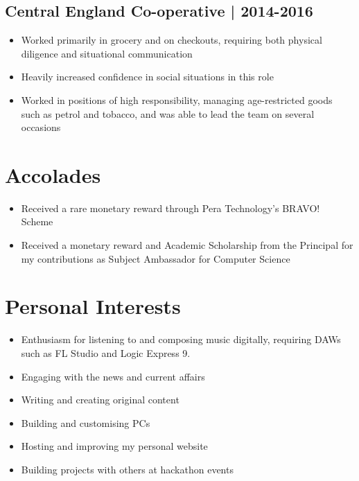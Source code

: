 \documentclass{article}
\begin{document}
\subsection*{Central England Co-operative | 2014-2016}
\begin{itemize}
	\item Worked primarily in grocery and on checkouts, requiring both physical diligence and situational communication
	\item Heavily increased confidence in social situations in this role
	\item Worked in positions of high responsibility, managing age-restricted goods such as petrol and tobacco, and was able to lead the team on several occasions
\end{itemize}
\section*{Accolades}
\begin{itemize}
	\item Received a rare monetary reward through Pera Technology's BRAVO! Scheme
	\item Received a monetary reward and Academic Scholarship from the Principal for my contributions as Subject Ambassador for Computer Science
\end{itemize}
\section*{Personal Interests}
\begin{itemize}
	\item Enthusiasm for listening to and composing music digitally, requiring DAWs such as FL Studio and Logic Express 9.
	\item Engaging with the news and current affairs
	\item Writing and creating original content
	\item Building and customising PCs
	\item Hosting and improving my personal website
	\item Building projects with others at hackathon events
\end{itemize}
\end{document}
